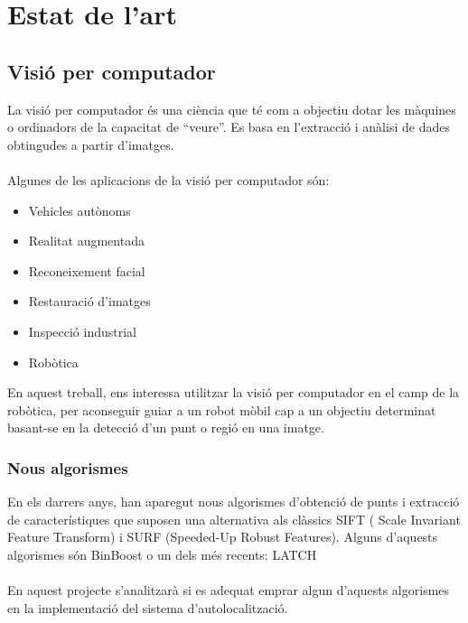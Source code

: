 \section{Estat de l'art}
	\subsection{Visió per computador}
		La visió per computador\cite{Szeliski} és una ciència que té com a objectiu dotar les màquines o ordinadors de la capacitat de ``veure''.
		Es basa en l'extracció i anàlisi de dades obtingudes a partir d'imatges.\\\\
		Algunes de les aplicacions de la visió per computador són:\\
		\begin{itemize}
			\item Vehicles autònoms
			\item Realitat augmentada
			\item Reconeixement facial
			\item Restauració d'imatges
			\item Inspecció industrial 
			\item Robòtica\\
		\end{itemize}
		En aquest treball, ens interessa utilitzar la visió per computador en el camp de la robòtica, per aconseguir guiar a un robot mòbil cap a un objectiu
		determinat basant-se en la detecció d'un punt o regió en una imatge.
		\subsubsection{Nous algorismes}
			En els darrers anys, han aparegut nous algorismes d'obtenció de punts i extracció de característiques que suposen una alternativa als clàssics SIFT\cite{SIFT}
			( Scale Invariant Feature Transform) i SURF\cite{SURF} (Speeded-Up Robust Features). Alguns d'aquests algorismes són BinBoost\cite{Trzcinski13a} o un dels més recents:
			LATCH\cite{LeviHassner2016LATCH}\\\\
			En aquest projecte s'analitzarà si es adequat emprar algun d'aquests algorismes en la implementació del sistema d'autolocalització. 
